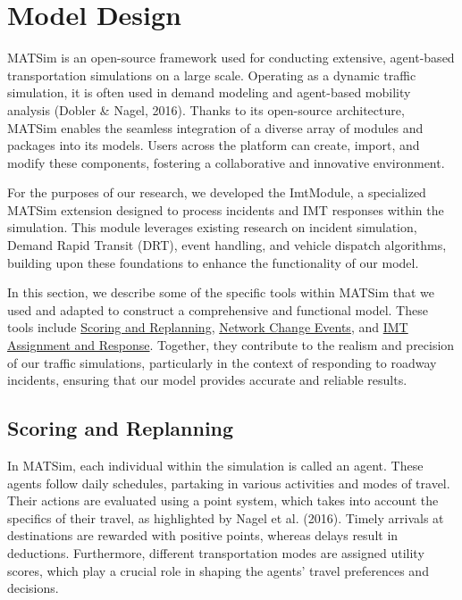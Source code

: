 \documentclass[fancy, oneside, mastersfancy, ms]{byuthesis}
\begin{document}
\hypertarget{sec-MATSim_mod}{%
\section{Model Design}\label{sec-MATSim_mod}}

MATSim is an open-source framework used for conducting extensive,
agent-based transportation simulations on a large scale. Operating as a
dynamic traffic simulation, it is often used in demand modeling and
agent-based mobility analysis (Dobler \& Nagel, 2016). Thanks to its
open-source architecture, MATSim enables the seamless integration of a
diverse array of modules and packages into its models. Users across the
platform can create, import, and modify these components, fostering a
collaborative and innovative environment.

For the purposes of our research, we developed the ImtModule, a
specialized MATSim extension designed to process incidents and IMT
responses within the simulation. This module leverages existing research
on incident simulation, Demand Rapid Transit (DRT), event handling, and
vehicle dispatch algorithms, building upon these foundations to enhance
the functionality of our model.

In this section, we describe some of the specific tools within MATSim
that we used and adapted to construct a comprehensive and functional
model. These tools include \protect\hyperlink{sec-MATSim_score}{Scoring
and Replanning}, \protect\hyperlink{sec-NCE}{Network Change Events}, and
\protect\hyperlink{sec-imt_response}{IMT Assignment and Response}.
Together, they contribute to the realism and precision of our traffic
simulations, particularly in the context of responding to roadway
incidents, ensuring that our model provides accurate and reliable
results.

\hypertarget{sec-MATSim_Score}{%
\subsection{Scoring and Replanning}\label{sec-MATSim_Score}}

In MATSim, each individual within the simulation is called an agent.
These agents follow daily schedules, partaking in various activities and
modes of travel. Their actions are evaluated using a point system, which
takes into account the specifics of their travel, as highlighted by
Nagel et al. (2016). Timely arrivals at destinations are rewarded with
positive points, whereas delays result in deductions. Furthermore,
different transportation modes are assigned utility scores, which play a
crucial role in shaping the agents' travel preferences and decisions.
\end{document}
